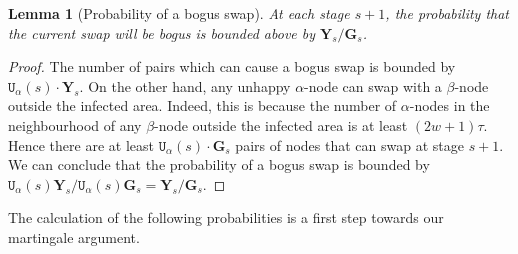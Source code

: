 \documentclass[11pt]{article}
\theoremstyle{plain}
\newtheorem{lem}[thm]{Lemma}
\numberwithin{equation}{subsection}
\newcommand{\GG}{\mathbf{G}}
\newcommand{\YY}{\mathbf{Y}}
\newcommand{\unhap}{\mathtt{U}}
\begin{document}
\begin{lem}[Probability of a bogus swap]\label{le:probboguss}
At each stage $s+1$, the probability that the current swap will
be bogus is bounded above by $\YY_s/\GG_s$. 
\end{lem}
\begin{proof}
The number of pairs which can cause a bogus swap is bounded by $\unhap_{\alpha}(s)\cdot \YY_s$.
On the other hand, any unhappy $\alpha$-node can swap with a $\beta$-node outside the
infected area. Indeed, this is because the number of $\alpha$-nodes in
the neighbourhood of any $\beta$-node outside the infected area 
is at least $(2w+1)\tau$.
Hence there are at least $\unhap_{\alpha}(s)\cdot \GG_s$ pairs of nodes that can swap
at stage $s+1$. We can conclude that the probability of a bogus swap is bounded by
$\unhap_{\alpha}(s)\YY_s/\unhap_{\alpha}(s)\GG_s=\YY_s/\GG_s$.
\end{proof}

The calculation of the following probabilities is a first step towards our martingale argument.
\end{document}
